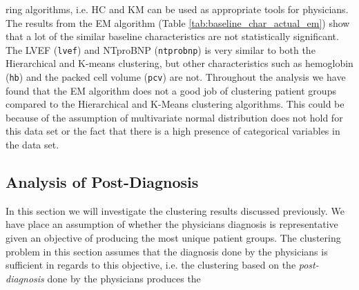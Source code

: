 \documentclass[../thesis.tex]{subfiles}
\begin{document}


\noindent ring algorithms, i.e. HC and KM can be used as appropriate tools for physicians. The results from the EM algorithm (Table \ref{tab:baseline_char_actual_em}) show that a lot of the similar baseline characteristics are not statistically significant. The LVEF (\texttt{lvef}) and NTproBNP (\texttt{ntprobnp}) is very similar to both the Hierarchical and K-means clustering, but other characteristics such as hemoglobin (\texttt{hb}) and the packed cell volume (\texttt{pcv}) are not. Throughout the analysis we have found that the EM algorithm does not a good job of clustering patient groups compared to the Hierarchical and K-Means clustering algorithms. This could be because of the assumption of multivariate normal distribution does not hold for this data set or the fact that there is a high presence of categorical variables in the data set.

\subsection{Analysis of Post-Diagnosis}

\noindent In this section we will investigate the clustering results discussed previously. We have place an assumption of whether the physicians diagnosis is representative given an objective of producing the most unique patient groups. The clustering problem in this section assumes that the diagnosis done by the physicians is sufficient in regards to this objective, i.e. the clustering based on the \textit{post-diagnosis} done by the physicians produces the  


\end{document}
